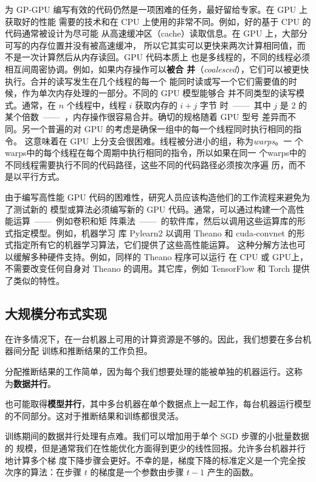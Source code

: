 为 GP-GPU 编写有效的代码仍然是一项困难的任务，最好留给专家。在 GPU 上获取好的性能
需要的技术和在 CPU 上使用的非常不同。例如，好的基于 CPU 的代码通常被设计为尽可能
从高速缓冲区（cache）读取信息。在 GPU 上，大部分可写的内存位置并没有被高速缓冲，
所以它其实可以更快来两次计算相同值，而不是一次计算然后从内存读回。GPU 代码本质上
也是多线程的，不同的线程必须相互间周密协调。例如，如果内存操作可以\textbf{被合
  并}（\textit{coalesced}），它们可以被更快执行。合并的读写发生在几个线程的每一个
能同时读或写一个它们需要值的时候，作为单次内存处理的一部分。不同的 GPU 模型能够合
并不同类型的读写模式。通常，在 $n$ 个线程中，线程 $i$ 获取内存的 $i + j$ 字节
时~——~其中 $j$ 是 $2$ 的某个倍数~——~，内存操作很容易合并。确切的规格随着 GPU 型号
差异而不同。另一个普遍的对 GPU 的考虑是确保一组中的每一个线程同时执行相同的指令。
这意味着在 GPU 上分支会很困难。线程被分进小的组，称为\emph{\gls{warps}}。一
个\gls*{warps}中的每个线程在每个周期中执行相同的指令，所以如果在同一
个\gls*{warps}中的不同线程需要执行不同的代码路径，这些不同的代码路径必须按次序遍
历，而不是以平行方式。

由于编写高性能 GPU 代码的困难性，研究人员应该构造他们的工作流程来避免为了测试新的
模型或算法必须编写新的 GPU 代码。通常，可以通过构建一个高性能运算~——~例如卷积和矩
阵乘法~——~的软件库，然后以调用这些运算库的形式指定模型。例如，机器学习
库 Pylearn2 \citep{Goodfellow+al-ICML2013-small} 以调用 Theano
\citep{bergstra+al:2010-scipy-short,Bastien-2012} 和 cuda-convnet
\citep{Krizhevsky2010tr} 的形式指定所有它的机器学习算法，它们提供了这些高性能运算。
这种分解方法也可以缓解多种硬件支持。例如，同样的 Theano 程序可以运行
在 CPU 或 GPU上，不需要改变任何自身对 Theano 的调用。其它库，例如 TensorFlow
\citep{tensorflow} 和 Torch \citep{Collobert-AISTATS2011} 提供了类似的特性。

\subsection{大规模分布式实现}
\label{subsec:large_scale_distributed_implementations}

在许多情况下，在一台机器上可用的计算资源是不够的。因此，我们想要在多台机器间分配
训练和推断结果的工作负担。

分配推断结果的工作简单，因为每个我们想要处理的能被单独的机器运行。这称
为\textbf{数据并行}。

也可能取得\textbf{模型并行}，其中多台机器在单个数据点上一起工作，每台机器运行模型
的不同部分。这对于推断结果和训练都很灵活。

训练期间的数据并行处理有点难。我们可以增加用于单个 \gls*{SGD} 步骤的小批量数据的
规模，但是通常我们在性能优化方面得到更少的线性回报。允许多台机器并行地计算多个梯
度下降步骤会更好。不幸的是，梯度下降的标准定义是一个完全按次序的算法：在步骤 $t$
的梯度是一个参数由步骤 $t-1$ 产生的函数。

